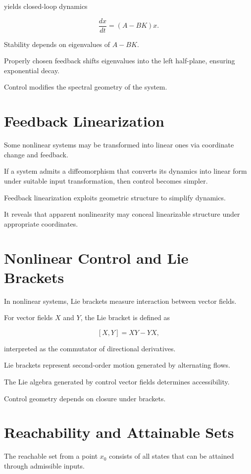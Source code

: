 \documentclass[12pt]{book}
\begin{document}
yields closed-loop dynamics

\[
\frac{dx}{dt} = (A - BK)x.
\]

Stability depends on eigenvalues of $A - BK$.

Properly chosen feedback shifts eigenvalues into the left half-plane, ensuring exponential decay.

Control modifies the spectral geometry of the system.

\section{Feedback Linearization}

Some nonlinear systems may be transformed into linear ones via coordinate change and feedback.

If a system admits a diffeomorphism that converts its dynamics into linear form under suitable input transformation, then control becomes simpler.

Feedback linearization exploits geometric structure to simplify dynamics.

It reveals that apparent nonlinearity may conceal linearizable structure under appropriate coordinates.

\section{Nonlinear Control and Lie Brackets}

In nonlinear systems, Lie brackets measure interaction between vector fields.

For vector fields $X$ and $Y$, the Lie bracket is defined as

\[
[X,Y] = XY - YX,
\]

interpreted as the commutator of directional derivatives.

Lie brackets represent second-order motion generated by alternating flows.

The Lie algebra generated by control vector fields determines accessibility.

Control geometry depends on closure under brackets.

\section{Reachability and Attainable Sets}

The reachable set from a point $x_0$ consists of all states that can be attained through admissible inputs.
\end{document}
